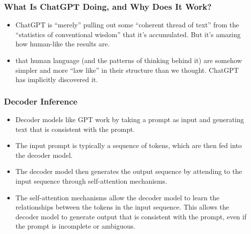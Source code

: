 \begin{frame}[fragile]\frametitle{What Is ChatGPT Doing, and Why Does It Work?}

\begin{itemize}
\item ChatGPT is “merely” pulling out some “coherent thread of text” from the “statistics of conventional wisdom” that it’s accumulated. But it’s amazing how human-like the results are.
\item that human language (and the patterns of thinking behind it) are somehow simpler and more “law like” in their structure than we thought. ChatGPT has implicitly discovered it.
\end{itemize}

\end{frame}

\begin{frame}[fragile]\frametitle{Decoder Inference}

\begin{itemize}
\item Decoder models like GPT work by taking a prompt as input and generating text that is consistent with the prompt. 
\item The input prompt is typically a sequence of tokens, which are then fed into the decoder model. 
\item The decoder model then generates the output sequence by attending to the input sequence through self-attention mechanisms.
\item The self-attention mechanisms allow the decoder model to learn the relationships between the tokens in the input sequence. This allows the decoder model to generate output that is consistent with the prompt, even if the prompt is incomplete or ambiguous.
\end{itemize}

\end{frame}

